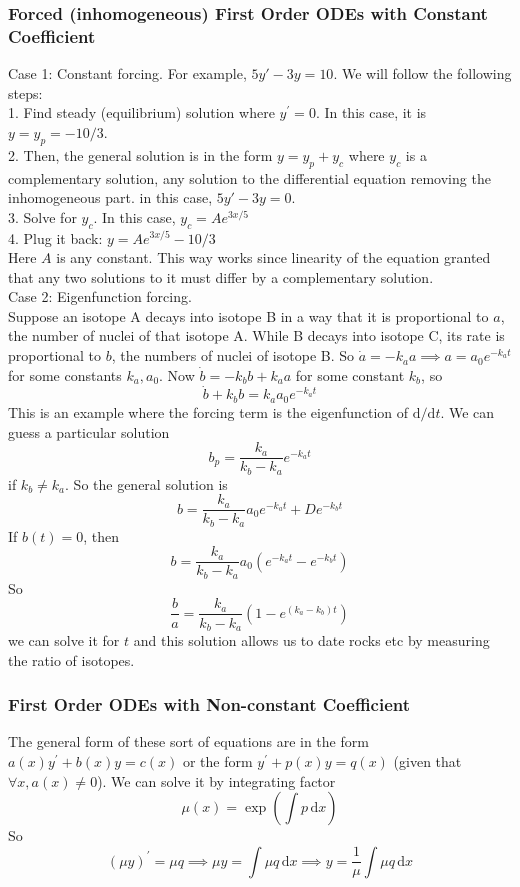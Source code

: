 \subsubsection{Forced (inhomogeneous) First Order ODEs with Constant Coefficient}
Case 1: Constant forcing.
For example, $5y'-3y=10$.
We will follow the following steps:\\
1. Find steady (equilibrium) solution where $y^\prime=0$.
In this case, it is $y=y_p=-10/3$.\\
2. Then, the general solution is in the form $y=y_p+y_c$ where $y_c$ is a complementary solution, any solution to the differential equation removing the inhomogeneous part.
in this case, $5y'-3y=0$.\\
3. Solve for $y_c$.
In this case, $y_c=Ae^{3x/5}$\\
4. Plug it back: $y=Ae^{3x/5}-10/3$\\
Here $A$ is any constant.
This way works since linearity of the equation granted that any two solutions to it must differ by a complementary solution.\\
Case 2: Eigenfunction forcing.\\
Suppose an isotope A decays into isotope B in a way that it is proportional to $a$, the number of nuclei of that isotope A.
While B decays into isotope C, its rate is proportional to $b$, the numbers of nuclei of isotope B.
So $\dot{a}=-k_aa\implies a=a_0e^{-k_at}$ for some constants $k_a,a_0$.
Now $\dot{b}=-k_bb+k_aa$ for some constant $k_b$, so
$$\dot{b}+k_bb=k_aa_0e^{-k_at}$$
This is an example where the forcing term is the eigenfunction of $\mathrm d/\mathrm dt$.
We can guess a particular solution
$$b_p=\frac{k_a}{k_b-k_a}e^{-k_at}$$
if $k_b\neq k_a$.
So the general solution is
$$b=\frac{k_a}{k_b-k_a}a_0e^{-k_at}+De^{-k_bt}$$
If $b(t)=0$, then
$$b=\frac{k_a}{k_b-k_a}a_0(e^{-k_at}-e^{-k_bt})$$
So
$$\frac{b}{a}=\frac{k_a}{k_b-k_a}(1-e^{(k_a-k_b)t})$$
we can solve it for $t$ and this solution allows us to date rocks etc by measuring the ratio of isotopes.
\subsubsection{First Order ODEs with Non-constant Coefficient}
The general form of these sort of equations are in the form $a(x)y^\prime+b(x)y=c(x)$ or the form $y^\prime+p(x)y=q(x)$ (given that $\forall x,a(x)\neq 0$).
We can solve it by integrating factor
$$\mu(x)=\exp\left(\int p\,\mathrm dx\right)$$
So
$$(\mu y)^\prime=\mu q\implies \mu y=\int \mu q\,\mathrm dx\implies y=\frac{1}{\mu}\int\mu q\,\mathrm dx$$
